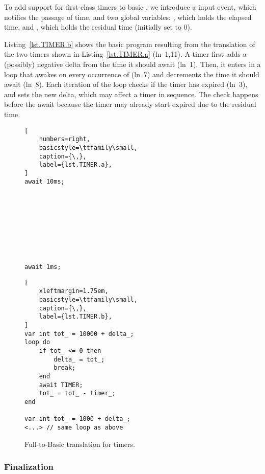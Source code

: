 To add support for first-class timers to basic \CEU , we introduce a
 input event, which notifies the passage of time, and two global
variables: , which holds the elapsed time, and ,
which holds the residual time (initially set to 0).

Listing~\ref{lst.TIMER.b} shows the basic \CEU program resulting from the
translation of the two timers shown in Listing~\ref{lst.TIMER.a} (ln~1,11).
A timer first adds a (possibly) negative delta from the time it should await
(ln~1).  Then, it enters in a loop that awakes on every occurrence of
 (ln~7) and decrements the time it should await (ln~8).  Each
iteration of the loop checks if the timer has expired (ln~3), and sets the
new delta, which may affect a timer in sequence.  The check happens before
the await because the timer may already start expired due to the residual
time.

\begin{figure}[!ht]
\begin{minipage}[t]{0.33\linewidth}
\begin{lstlisting}[
    numbers=right,
    basicstyle=\ttfamily\small,
    caption={\,},
    label={lst.TIMER.a},
]
await 10ms;









await 1ms;

\end{lstlisting}
\end{minipage}
%
\begin{minipage}[t]{0.63\linewidth}
\begin{lstlisting}[
    xleftmargin=1.75em,
    basicstyle=\ttfamily\small,
    caption={\,},
    label={lst.TIMER.b},
]
var int tot_ = 10000 + delta_;
loop do
    if tot_ <= 0 then
        delta_ = tot_;
        break;
    end
    await TIMER;
    tot_ = tot_ - timer_;
end

var int tot_ = 1000 + delta_;
<...> // same loop as above
\end{lstlisting}
\end{minipage}
\caption{ Full-to-Basic translation for timers. }
\label{lst.TIMER}
\end{figure}

\subsubsection*{Finalization}


